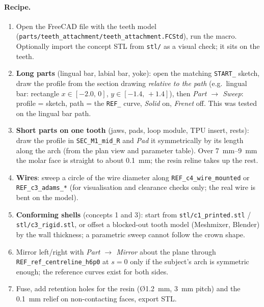 \paragraph{Recipe.}
\begin{enumerate}
\item Open the FreeCAD file with the teeth model
(\texttt{parts/teeth\_attachment/teeth\_attachment.FCStd}), run the macro. Optionally import the concept
STL from \texttt{stl/} as a visual check; it sits on the teeth.
\item \textbf{Long parts} (lingual bar, labial bar, yoke): open the matching \texttt{START\_} sketch,
draw the profile from the section drawing \emph{relative to the path} (e.g.\ lingual bar: rectangle
$x\in[-2.0,\,0]$, $y\in[-1.4,\,+1.4]$), then \emph{Part $\rightarrow$ Sweep}: profile = sketch,
path = the \texttt{REF\_} curve, \emph{Solid} on, \emph{Frenet} off. This was tested on the
lingual bar path.
\item \textbf{Short parts on one tooth} (jaws, pads, loop module, TPU insert, rests): draw the
profile in \texttt{SEC\_M1\_mid\_R} and \emph{Pad} it symmetrically by its length along the arch
(from the plan view and parameter table). Over \SIrange{7}{9}{mm} the molar face is straight to
about \SI{0.1}{mm}; the resin reline takes up the rest.
\item \textbf{Wires}: sweep a circle of the wire diameter along \texttt{REF\_c4\_wire\_mounted} or
\texttt{REF\_c3\_adams\_*} (for visualisation and clearance checks only; the real wire is bent on
the model).
\item \textbf{Conforming shells} (concepts 1 and 3): start from \texttt{stl/c1\_printed.stl} /
\texttt{stl/c3\_rigid.stl}, or offset a blocked-out tooth model (Meshmixer, Blender) by the wall
thickness; a parametric sweep cannot follow the crown shape.
\item Mirror left/right with \emph{Part $\rightarrow$ Mirror} about the plane through
\texttt{REF\_ref\_centreline\_h6p0} at $s=0$ only if the subject's arch is symmetric enough; the
reference curves exist for both sides.
\item Fuse, add retention holes for the resin (Ø\SI{1.2}{mm}, \SI{3}{mm} pitch) and the
\SI{0.1}{mm} relief on non-contacting faces, export STL.
\end{enumerate}

